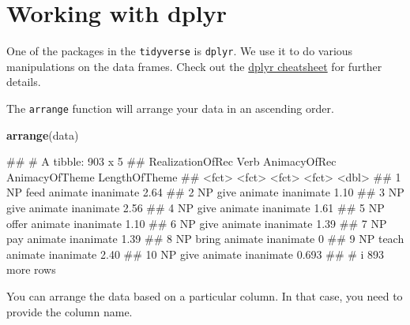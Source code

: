 \documentclass[
]{book}
\newenvironment{Shaded}{\begin{snugshade}}{\end{snugshade}}
\newcommand{\FunctionTok}[1]{\textcolor[rgb]{0.13,0.29,0.53}{\textbf{#1}}}
\newcommand{\NormalTok}[1]{#1}
\begin{document}
\hypertarget{working-with-dplyr}{%
\section{Working with dplyr}\label{working-with-dplyr}}

One of the packages in the \texttt{tidyverse} is \texttt{dplyr}. We use it to do various manipulations on the data frames. Check out the \href{https://nyu-cdsc.github.io/learningr/assets/data-transformation.pdf}{dplyr cheatsheet} for further details.

The \texttt{arrange} function will arrange your data in an ascending order.

\begin{Shaded}
\begin{Highlighting}[]
\FunctionTok{arrange}\NormalTok{(data)}
\end{Highlighting}
\end{Shaded}

\begin{Shaded}
\begin{Highlighting}[]
\NormalTok{\#\# \# A tibble: 903 x 5}
\NormalTok{\#\#    RealizationOfRec Verb  AnimacyOfRec AnimacyOfTheme LengthOfTheme}
\NormalTok{\#\#    \textless{}fct\textgreater{}            \textless{}fct\textgreater{} \textless{}fct\textgreater{}        \textless{}fct\textgreater{}                  \textless{}dbl\textgreater{}}
\NormalTok{\#\#  1 NP               feed  animate      inanimate              2.64 }
\NormalTok{\#\#  2 NP               give  animate      inanimate              1.10 }
\NormalTok{\#\#  3 NP               give  animate      inanimate              2.56 }
\NormalTok{\#\#  4 NP               give  animate      inanimate              1.61 }
\NormalTok{\#\#  5 NP               offer animate      inanimate              1.10 }
\NormalTok{\#\#  6 NP               give  animate      inanimate              1.39 }
\NormalTok{\#\#  7 NP               pay   animate      inanimate              1.39 }
\NormalTok{\#\#  8 NP               bring animate      inanimate              0    }
\NormalTok{\#\#  9 NP               teach animate      inanimate              2.40 }
\NormalTok{\#\# 10 NP               give  animate      inanimate              0.693}
\NormalTok{\#\# \# i 893 more rows}
\end{Highlighting}
\end{Shaded}

You can arrange the data based on a particular column. In that case, you need to provide the column name.
\end{document}
